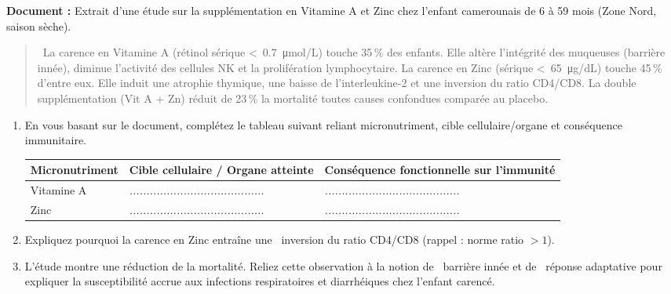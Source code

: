 \documentclass[11pt]{article}
\begin{document}
\begin{exercice}
\textbf{Document :} Extrait d'une étude sur la supplémentation en Vitamine A et Zinc chez l'enfant camerounais de 6 à 59 mois (Zone Nord, saison sèche).
\begin{quote}
\og\ La carence en Vitamine A (rétinol sérique \textless\ \SI{0,7}{\micro mol/L}) touche 35\,\% des enfants. Elle altère l'intégrité des muqueuses (barrière innée), diminue l'activité des cellules NK et la prolifération lymphocytaire. La carence en Zinc (sérique \textless\ \SI{65}{\micro g/dL}) touche 45\,\% d'entre eux. Elle induit une atrophie thymique, une baisse de l'interleukine-2 et une inversion du ratio CD4/CD8. La double supplémentation (Vit A + Zn) réduit de 23\,\% la mortalité toutes causes confondues comparée au placebo.\fg{}
\end{quote}

\begin{enumerate}
    \item En vous basant sur le document, complétez le tableau suivant reliant micronutriment, cible cellulaire/organe et conséquence immunitaire.
    \begin{tabular}{|p{2.5cm}|p{5cm}|p{5cm}|}
    \hline
    \textbf{Micronutriment} & \textbf{Cible cellulaire / Organe atteinte} & \textbf{Conséquence fonctionnelle sur l'immunité} \\
    \hline
    Vitamine A & \textit{........................................} & \textit{........................................} \\
    \hline
    Zinc & \textit{........................................} & \textit{........................................} \\
    \hline
    \end{tabular}
    \item Expliquez pourquoi la carence en Zinc entraîne une \og\ inversion du ratio CD4/CD8\fg{} (rappel : norme ratio $>1$).
    \item L'étude montre une réduction de la mortalité. Reliez cette observation à la notion de \og\ barrière innée\fg{} et de \og\ réponse adaptative\fg{} pour expliquer la susceptibilité accrue aux infections respiratoires et diarrhéiques chez l'enfant carencé.
\end{enumerate}
\end{exercice}
\end{document}
